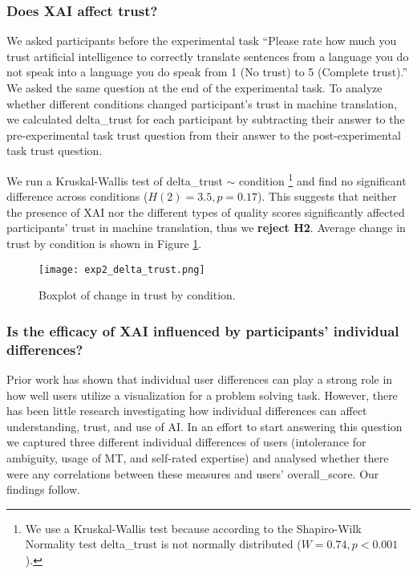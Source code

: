 \subsubsection{Does XAI affect trust?}

We asked participants before the experimental task “Please rate how much you trust artificial intelligence to correctly translate sentences from a language you do not speak into a language you do speak from 1 (No trust) to 5 (Complete trust).”  We asked the same question at the end of the experimental task. To analyze whether different conditions changed participant’s trust in machine translation, we calculated delta\_trust for each participant by subtracting their answer to the pre-experimental task trust question from their answer to the post-experimental task trust question. 

We run a Kruskal-Wallis test of delta\_trust $\sim$ condition \footnote{We use a Kruskal-Wallis test because according to the Shapiro-Wilk Normality test delta_trust is not normally distributed ($W = 0.74, p < 0.001$).} and find no significant difference across conditions ($H(2) = 3.5, p = 0.17$). This suggests that neither the presence of XAI nor the different types of quality scores significantly affected participants’ trust in machine translation, thus we \textbf{reject H2}. Average change in trust by condition is shown in Figure \ref{fig:exp_delta_trust}.

\begin{figure}[h!]
    \centering
    \texttt{[image: exp2\_delta\_trust.png]}
    \caption{Boxplot of change in trust by condition.}
    \label{fig:exp_delta_trust}
\end{figure}

\subsubsection{Is the efficacy of XAI influenced by participants' individual differences?}

Prior work has shown that individual user differences can play a strong role in how well users utilize a visualization for a problem solving task\cite{liuSurvey2020}. However, there has been little research investigating how individual differences can affect understanding, trust, and use of AI. In an effort to start answering this question we captured three different individual differences of users (intolerance for ambiguity, usage of MT, and self-rated expertise) and analysed whether there were any correlations between these measures and users’ overall\_score. Our findings follow.

